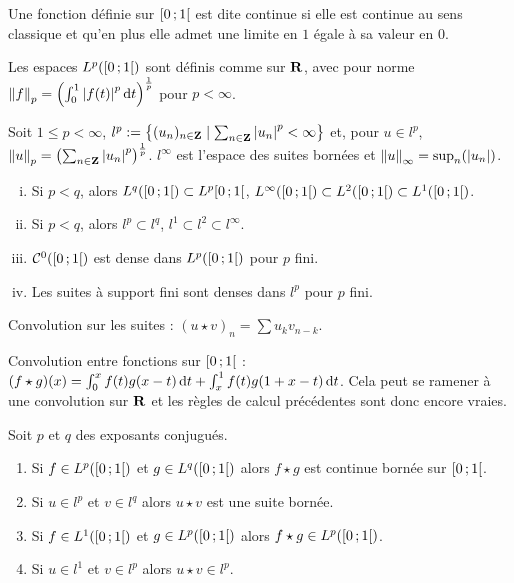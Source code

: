 \begin{defn}
	Une fonction définie sur $\intfo{0}{1}$ est dite continue si elle est continue au sens classique et qu'en plus elle admet une limite en $1$ égale à sa valeur en $0$.
\end{defn}

\begin{defn}
	Les espaces $L^p (\intfo{0}{1})$ sont définis comme sur $\R$, avec pour norme $\norme{f}_p = \left( \int_0^1 \abs{f(t)}^p \diff t \right)^{\frac{1}{p}}$ pour $p < \infty$.
\end{defn}

\begin{defn}
	Soit $1 \leq p < \infty$, $l^p := \left\{ (u_n)_{n \in \Z} \mid \sum_{n \in \Z} \abs{u_n}^p < \infty \right\}$ et, pour $u \in l^p$, $\norme{u}_p = \left( \sum_{n \in \Z} \abs{u_n}^p \right)^{\frac{1}{p}}$.
	$l^\infty$ est l'espace des suites bornées et $\norme{u}_\infty = \sup_n(\abs{u_n})$.
\end{defn}

\begin{pop}
	\begin{enumerate}[(i)]
		\item Si $p < q$, alors $L^q (\intfo{0}{1}) \subset L^p \intfo{0}{1}$, $L^\infty (\intfo{0}{1}) \subset L^2 (\intfo{0}{1}) \subset L^1 (\intfo{0}{1})$.
		\item Si $p < q$, alors $l^p \subset l^q$, $l^1 \subset l^2 \subset l^\infty$.
		\item $\cont^0 (\intfo{0}{1})$ est dense dans $L^p (\intfo{0}{1})$ pour $p$ fini.
		\item Les suites à support fini sont denses dans $l^p$ pour $p$ fini.
	\end{enumerate}
\end{pop}

\begin{defn}
	Convolution sur les suites : $(u \star v)_n = \sum u_k v_{n - k}$.
\end{defn}

\begin{defn}
	Convolution entre fonctions sur $\intfo{0}{1}$ : $(f \star g)(x) = \int_0^x f(t) g(x - t) \diff t + \int_x^1 f(t) g(1 + x - t) \diff t$.
	Cela peut se ramener à une convolution sur $\R$ et les règles de calcul précédentes sont donc encore vraies.
\end{defn}

\begin{pop}
	Soit $p$ et $q$ des exposants conjugués.
	\begin{enumerate}
		\item Si $f \in L^p(\intfo{0}{1})$ et $g \in L^q(\intfo{0}{1})$ alors $f \star g$ est continue bornée sur $\intfo{0}{1}$.
		\item Si $u \in l^p$ et $v \in l^q$ alors $u \star v$ est une suite bornée.
		\item Si $f \in L^1(\intfo{0}{1})$ et $g \in L^p(\intfo{0}{1})$ alors $f \star g \in L^p(\intfo{0}{1})$.
		\item Si $u \in l^1$ et $v \in l^p$ alors $u \star v \in l^p$.
	\end{enumerate}
\end{pop}

